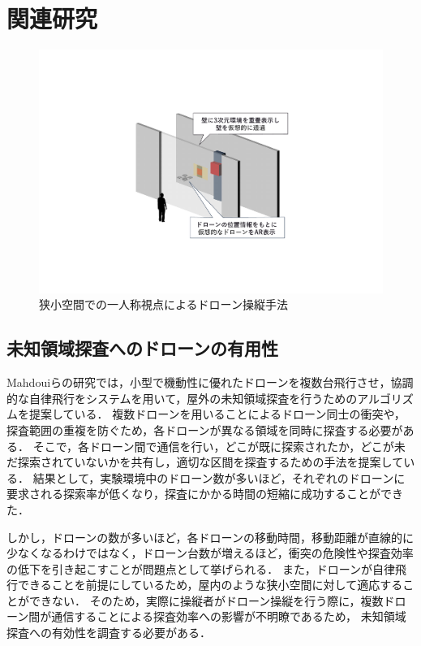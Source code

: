 \documentclass[a4paper,11pt]{ujreport}
\begin{document}
\chapter{関連研究}
\label{chap:RelatedWorks}

\begin{figure}[tb]
  \centering
  \includegraphics[width=0.7\linewidth]{img/02_relation.pdf}
  \caption{狭小空間での一人称視点によるドローン操縦手法}
  \label{fig:02_relation}
\end{figure}

\section{未知領域探査へのドローンの有用性}
\label{sec:UnknownArea}
Mahdouiらの研究\cite{book-multi03}では，小型で機動性に優れたドローンを複数台飛行させ，協調的な自律飛行をシステムを用いて，屋外の未知領域探査を行うためのアルゴリズムを提案している．
複数ドローンを用いることによるドローン同士の衝突や，探査範囲の重複を防ぐため，各ドローンが異なる領域を同時に探査する必要がある．
そこで，各ドローン間で通信を行い，どこが既に探索されたか，どこが未だ探索されていないかを共有し，適切な区間を探査するための手法を提案している．
結果として，実験環境中のドローン数が多いほど，それぞれのドローンに要求される探索率が低くなり，探査にかかる時間の短縮に成功することができた．

しかし，ドローンの数が多いほど，各ドローンの移動時間，移動距離が直線的に少なくなるわけではなく，ドローン台数が増えるほど，衝突の危険性や探査効率の低下を引き起こすことが問題点として挙げられる．
また，ドローンが自律飛行できることを前提にしているため，屋内のような狭小空間に対して適応することができない．
そのため，実際に操縦者がドローン操縦を行う際に，複数ドローン間が通信することによる探査効率への影響が不明瞭であるため，
未知領域探査への有効性を調査する必要がある．
\end{document}
